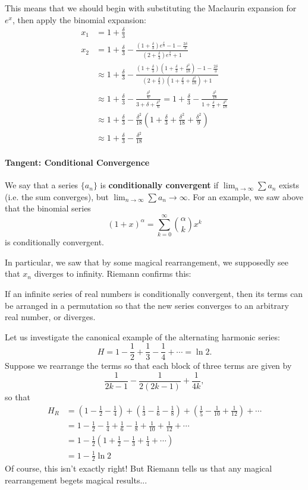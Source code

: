 \documentclass[../jarvis.tex]{subfiles}
\begin{document}
This means that we should begin with substituting the Maclaurin expansion for $e^x$, then apply the binomial expansion:
\begin{align*}
    x_1 &= 1+\frac{\delta}{3}\\
    x_2 &= 1+\frac{\delta}{3}-\frac{\left(1+\frac{\delta}{3}\right)e^{\frac{\delta}{3}}-1-\frac{2\delta}{3}}{\left(2+\frac{\delta}{3}\right)e^\frac{\delta}{3}+1} \\
    &\approx 1+\frac{\delta}{3}-\frac{\left(1+\frac{\delta}{3}\right)\left(1+\frac{\delta}{3}+\frac{\delta^2}{18}\right)-1-\frac{2\delta}{3}}{\left(2+\frac{\delta}{3}\right)\left(1+\frac{\delta}{3}+\frac{\delta^2}{18}\right)+1} \\
    &\approx 1+\frac{\delta}{3}-\frac{\frac{\delta^2}{6}}{3+\delta+\frac{\delta^2}{6}} =1+\frac{\delta}{3}-\frac{\frac{\delta^2}{18}}{1+\frac{\delta}{3}+\frac{\delta^2}{18}} \\
    &\approx 1+\frac{\delta}{3}-\frac{\delta^2}{18}\left(1+\frac{\delta}{3}+\frac{\delta^2}{18}+\frac{\delta^2}{9}\right) \\ 
    &\approx 1+\frac{\delta}{3}-\frac{\delta^2}{18}
\end{align*}

\paragraph{Tangent: Conditional Convergence}
We say that a series $\{a_n\}$ is \textbf{conditionally convergent} if $\lim_{n\to\infty}\sum a_n$ exists (i.e. the sum converges), but $\lim_{n\to\infty}\sum a_n \to \infty$. For an example, we saw above that the binomial series
$$(1+x)^{\alpha}=\sum_{k=0}^{\infty}\binom{\alpha}{k}x^k$$
is conditionally convergent.

In particular, we saw that by some magical rearrangement, we supposedly see that $x_n$ diverges to infinity. Riemann confirms this:
\begin{theorem}
If an infinite series of real numbers is conditionally convergent, then its terms can be arranged in a permutation so that the new series converges to an arbitrary real number, or diverges.
\end{theorem}
Let us investigate the canonical example of the alternating harmonic series:
$$H=1-\frac{1}{2}+\frac{1}{3}-\frac{1}{4}+\cdots=\ln{2}.$$
Suppose we rearrange the terms so that each block of three terms are given by
$$\frac{1}{2k-1}-\frac{1}{2(2k-1)}+\frac{1}{4k},$$
so that 
\begin{align*}
    H_{R}&=\left(1-\frac{1}{2}-\frac{1}{4}\right)+\left(\frac{1}{3}-\frac{1}{6}-\frac{1}{8}\right)+\left(\frac{1}{5}-\frac{1}{10}+\frac{1}{12}\right)+\cdots \\
    &=1-\frac{1}{2}-\frac{1}{4}+\frac{1}{6}-\frac{1}{8}+\frac{1}{10}+\frac{1}{12} +\cdots \\
    &=1-\frac{1}{2}\left(1+\frac{1}{2}-\frac{1}{3}+\frac{1}{4}+\cdots\right) \\
    &=1-\frac{1}{2}\ln{2}
\end{align*}
Of course, this isn't exactly right! But Riemann tells us that any magical rearrangement begets magical results...
\end{document}

